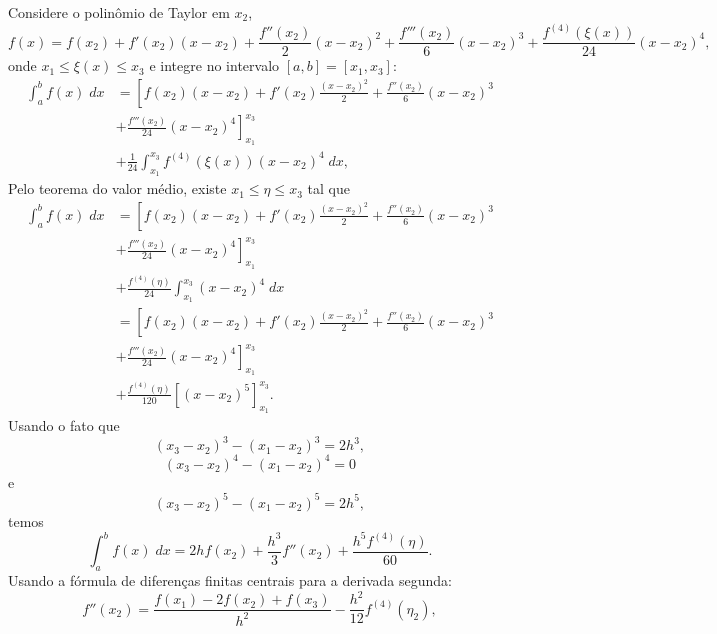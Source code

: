 Considere o polinômio de Taylor em $x_2$,
\begin{equation}
f(x)=f(x_2)+f'(x_2)(x-x_2)+\frac{f''(x_2)}{2}(x-x_2)^2+\frac{f'''(x_2)}{6}(x-x_2)^3+\frac{f^{(4)}(\xi(x))}{24}(x-x_2)^4,
\end{equation}
onde $x_1\leq\xi(x)\leq x_3$ e integre no intervalo $[a,b]=[x_1,x_3]$:
\begin{equation}
  \begin{split}
    \int_a^bf(x)\;dx&= \left[f(x_2)(x-x_2)+f'(x_2)\frac{(x-x_2)^2}{2} + \frac{f''(x_2)}{6}(x-x_2)^3\right. \\
      &\left. + \frac{f'''(x_2)}{24}(x-x_2)^4\right]_{x_1}^{x_3}\\
      &+ \frac{1}{24}\int_{x_1}^{x_3}f^{(4)}(\xi(x))(x-x_2)^4\;dx,
  \end{split}
\end{equation}
Pelo teorema do valor médio, existe $x_1\leq\eta\leq x_3$ tal que
\begin{equation}
  \begin{split}
    \int_a^bf(x)\;dx&= \left[f(x_2)(x-x_2)+f'(x_2)\frac{(x-x_2)^2}{2}+\frac{f''(x_2)}{6}(x-x_2)^3\right.\\
    &+\left.\frac{f'''(x_2)}{24}(x-x_2)^4\right]_{x_1}^{x_3}\\
    &+ \frac{f^{(4)}(\eta)}{24}\int_{x_1}^{x_3}(x-x_2)^4\;dx\\
    &= \left[f(x_2)(x-x_2)+f'(x_2)\frac{(x-x_2)^2}{2}+\frac{f''(x_2)}{6}(x-x_2)^3\right.\\
    &+\left.\frac{f'''(x_2)}{24}(x-x_2)^4\right]_{x_1}^{x_3}\\
    &+ \frac{f^{(4)}(\eta)}{120}\left[(x-x_2)^5\right]_{x_1}^{x_3}.
  \end{split}
\end{equation}
Usando o fato que
\begin{equation}
(x_3-x_2)^3-(x_1-x_2)^3=2h^3,
\end{equation}
\begin{equation}
(x_3-x_2)^4-(x_1-x_2)^4=0
\end{equation}
e
\begin{equation}
(x_3-x_2)^5-(x_1-x_2)^5=2h^5,
\end{equation}
temos
\begin{equation}
\int_a^bf(x)\;dx=2hf(x_2)+\frac{h^3}{3}f''(x_2)+\frac{h^5f^{(4)}(\eta)}{60}.
\end{equation}
Usando a fórmula de diferenças finitas centrais para a derivada segunda:
\begin{equation}
f''(x_2)=\frac{f(x_1)-2f(x_2)+f(x_3)}{h^2}-\frac{h^2}{12}f^{(4)}(\eta_2),
\end{equation}
